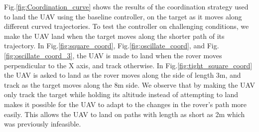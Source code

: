 \documentclass[conf]{new-aiaa}
\begin{document}
Fig.\ref{fig:Coordination_curve} shows the results of the coordination strategy used to land the UAV using the baseline controller, on the target as it moves along different curved trajectories. To test the controller on challenging conditions, we make the UAV land when the target moves along the shorter path of its trajectory. In Fig.\ref{fig:square_coord}, Fig.\ref{fig:oscillate_coord}, and Fig.\ref{fig:oscillate_coord_3}, the UAV is made to land when the rover moves perpendicular to the X axis, and track otherwise. In Fig.\ref{fig:tight_square_coord} the UAV is asked to land as the rover moves along the side of length 3m, and track as the target moves along the 8m side. We observe that by making the UAV only track the target while holding its altitude instead of attempting to land makes it possible for the UAV to adapt to the changes in the rover's path more easily. This allows the UAV to land on paths with length as short as 2m which was previously infeasible.

\newpage
\end{document}
